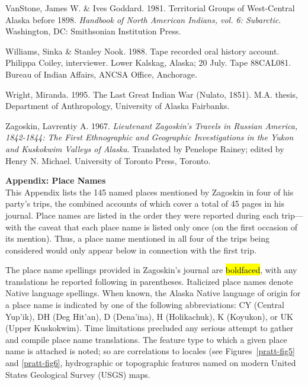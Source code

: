 \begin{hang}
VanStone, James W. \& Ives Goddard. 1981. Territorial Groups of West-Central Alaska before 1898. \textit{Handbook of North American Indians, vol. 6: Subarctic}. Washington, DC: Smithsonian Institution Press.

Williams, Sinka \& Stanley Nook. 1988. Tape recorded oral history account. Philippa Coiley, interviewer. Lower Kalskag, Alaska; 20 July. Tape 88CAL081. Bureau of Indian Affairs, ANCSA Office, Anchorage.

Wright, Miranda. 1995. The Last Great Indian War (Nulato, 1851). M.A. thesis, Department of Anthropology, University of Alaska Fairbanks.

Zagoskin, Lavrentiy A. 1967. \textit{Lieutenant Zagoskin’s Travels in Russian America, 1842-1844: The First Ethnographic and Geographic Investigations in the Yukon and Kuskokwim Valleys of Alaska}.  Translated by Penelope Rainey; edited by Henry N. Michael.  University of Toronto Press, Toronto.


\end{hang}

\vspace{1cm}




\clearpage
\noindent
\textbf{\large Appendix: Place Names} \\


\noindent
This Appendix lists the 145 named places mentioned by Zagoskin in four of his party’s trips, the combined accounts of which cover a total of 45 pages in his journal. Place names are listed in the order they were reported during each trip—with the caveat that each place name is listed only once (on the first occasion of its mention). Thus, a place name mentioned in all four of the trips being considered would only appear below in connection with the first trip.



The place name spellings provided in Zagoskin’s journal are \hl{boldfaced}, with any translations he reported following in parentheses. Italicized place names denote Native language spellings. When known, the Alaska Native language of origin for a place name is indicated by one of the following abbreviations: CY (Central Yup’ik), DH (Deg Hit’an), D (Dena’ina), H (Holikachuk), K (Koyukon), or UK (Upper Kuskokwim). Time limitations precluded any serious attempt to gather and compile place name translations. The feature type to which a given place name is attached is noted; so are correlations to locales (see Figures~\ref{pratt-fig5} and \ref{pratt-fig6}, hydrographic or topographic features named on modern United States Geological Survey (USGS) maps.



